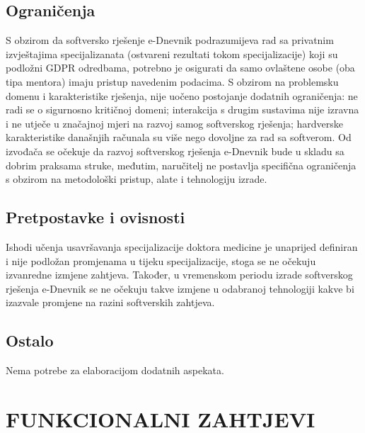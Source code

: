 \documentclass{scrreprt}
\begin{document}
\section{Ograničenja}
S obzirom da softversko rješenje e-Dnevnik podrazumijeva rad sa privatnim izvještajima specijalizanata (ostvareni rezultati tokom specijalizacije) koji su podložni GDPR odredbama, potrebno je osigurati da samo ovlaštene osobe (oba tipa mentora) imaju pristup navedenim podacima. S obzirom na problemsku domenu i karakteristike rješenja, nije uočeno postojanje dodatnih ograničenja: ne radi se o sigurnosno kritičnoj domeni; interakcija s drugim sustavima nije izravna i ne utječe u značajnoj mjeri na razvoj samog softverskog rješenja; hardverske karakteristike današnjih računala su više nego dovoljne za rad sa softverom. Od izvođača se očekuje da razvoj softverskog rješenja e-Dnevnik bude u skladu sa dobrim praksama struke, međutim, naručitelj ne postavlja specifična ograničenja s obzirom na metodološki pristup, alate i tehnologiju izrade.

\section{Pretpostavke i ovisnosti}
Ishodi učenja usavršavanja specijalizacije doktora medicine je unaprijed definiran i nije podložan promjenama u tijeku specijalizacije, stoga se ne očekuju izvanredne izmjene zahtjeva. Također, u vremenskom periodu izrade softverskog rješenja e-Dnevnik se ne očekuju takve izmjene u odabranoj tehnologiji kakve bi izazvale promjene na razini softverskih zahtjeva.

\section{Ostalo}
Nema potrebe za elaboracijom dodatnih aspekata.

\chapter{FUNKCIONALNI ZAHTJEVI}
\end{document}
